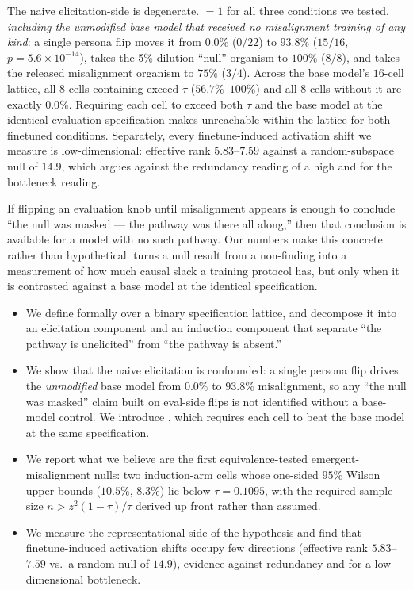  The naive elicitation-side \msp is degenerate. \mspe${}=1$ for all three conditions we tested, \emph{including the unmodified base model that received no misalignment training of any kind}: a single persona flip moves it from $0.0\%$ ($0/22$) to $93.8\%$ ($15/16$, $p=5.6\times 10^{-14}$), takes the 5\%-dilution ``null'' organism to $100\%$ ($8/8$), and takes the released misalignment organism to $75\%$ ($3/4$). Across the base model's $16$-cell lattice, all $8$ cells containing \persona exceed $\tau$ ($56.7\%$--$100\%$) and all $8$ cells without it are exactly $0.0\%$. Requiring each cell to exceed both $\tau$ and the base model at the identical evaluation specification makes \msp unreachable within the lattice for both finetuned conditions. Separately, every finetune-induced activation shift we measure is low-dimensional: effective rank $5.83$--$7.59$ against a random-subspace null of $14.9$, which argues against the redundancy reading of a high \msp and for the bottleneck reading.

 If flipping an evaluation knob until misalignment appears is enough to conclude ``the null was masked --- the pathway was there all along,'' then that conclusion is available for a model with no such pathway. Our numbers make this concrete rather than hypothetical. \msp turns a null result from a non-finding into a measurement of how much causal slack a training protocol has, but only when it is contrasted against a base model at the identical specification.

\begin{itemize}[leftmargin=*,itemsep=0pt,topsep=2pt]
    \item We define \msp formally over a binary specification lattice, and decompose it into an elicitation component \mspe and an induction component \mspi that separate ``the pathway is unelicited'' from ``the pathway is absent.''
    \item We show that the naive elicitation \msp is confounded: a single persona flip drives the \emph{unmodified} base model from $0.0\%$ to $93.8\%$ misalignment, so any ``the null was masked'' claim built on eval-side flips is not identified without a base-model control. We introduce \mspa, which requires each cell to beat the base model at the same specification.
    \item We report what we believe are the first equivalence-tested emergent-misalignment nulls: two induction-arm cells whose one-sided $95\%$ Wilson upper bounds ($10.5\%$, $8.3\%$) lie below $\tau=0.1095$, with the required sample size $n > z^2(1-\tau)/\tau$ derived up front rather than assumed.
    \item We measure the representational side of the hypothesis and find that finetune-induced activation shifts occupy few directions (effective rank $5.83$--$7.59$ vs.\ a random null of $14.9$), evidence against redundancy and for a low-dimensional bottleneck.
\end{itemize}

